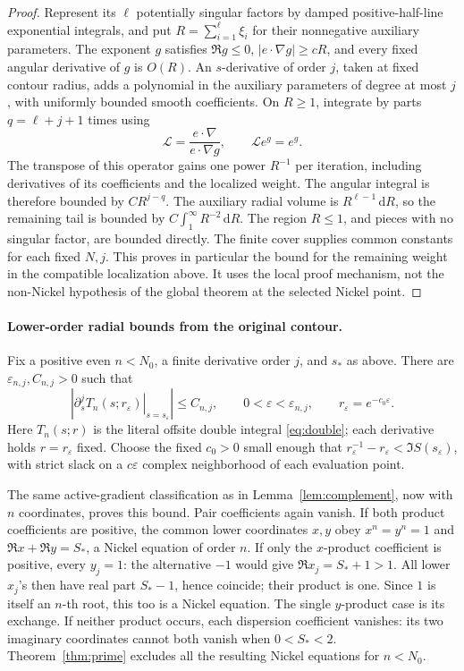 \documentclass[11pt]{article}
\numberwithin{equation}{section}
\theoremstyle{definition}
\newcommand{\dd}{\,\mathrm d}
\newcommand{\eps}{\varepsilon}
\begin{document}
\begin{proof}
Represent its \(\ell\) potentially singular factors by damped
positive-half-line exponential integrals, and put
\(R=\sum_{i=1}^{\ell}\xi_i\) for their nonnegative auxiliary
parameters. The exponent \(g\) satisfies \(\Re g\le0\),
\(|e\cdot\nabla g|\ge cR\), and every fixed angular derivative
of \(g\) is \(O(R)\). An \(s\)-derivative of order \(j\), taken
at fixed contour radius, adds a polynomial in the auxiliary parameters
of degree at most \(j\), with uniformly bounded smooth coefficients.
On \(R\ge1\), integrate by parts \(q=\ell+j+1\) times using
\[
 \mathcal L=\frac{e\cdot\nabla}{e\cdot\nabla g},
 \qquad \mathcal L e^g=e^g.
\]
The transpose of this operator gains one power \(R^{-1}\) per
iteration, including derivatives of its coefficients and the localized
weight. The angular integral is therefore bounded by \(CR^{j-q}\).
The auxiliary radial volume is \(R^{\ell-1}\dd R\), so the
remaining tail is bounded by \(C\int_1^\infty R^{-2}\dd R\).
The region \(R\le1\), and pieces with no singular factor, are bounded
directly. The finite cover supplies common constants for each fixed
\(N,j\). This proves in particular the bound for the remaining
weight in the compatible localization above. It uses the local proof
mechanism, not the non-Nickel hypothesis of the global theorem at
the selected Nickel point.
\end{proof}

\paragraph{Lower-order radial bounds from the original contour.}
Fix a positive even \(n<N_0\), a finite derivative order \(j\), and
\(s_*\) as above. There are \(\eps_{n,j},C_{n,j}>0\) such that
\[
 \left|\left.\partial_s^j T_n(s;r_\eps)\right|_{s=s_\eps}\right|
 \le C_{n,j},\qquad 0<\eps<\eps_{n,j},\qquad
 r_\eps=e^{-c_0\eps}.
\]
Here \(T_n(s;r)\) is the literal offsite double integral
\eqref{eq:double}; each derivative holds \(r=r_\eps\) fixed.
Choose the fixed \(c_0>0\) small enough that
\(r_\eps^{-1}-r_\eps<\Im S(s_\eps)\), with strict slack on a
\(c\eps\) complex neighborhood of each evaluation point.

The same active-gradient classification as in
Lemma~\ref{lem:complement}, now with \(n\) coordinates, proves this bound. Pair coefficients
again vanish. If both product coefficients are positive, the common
lower coordinates \(x,y\) obey \(x^n=y^n=1\) and
\(\Re x+\Re y=S_*\), a Nickel equation of order \(n\).
If only the \(x\)-product coefficient is positive, every \(y_j=1\):
the alternative \(-1\) would give \(\Re x_j=S_*+1>1\).
All lower \(x_j\)'s then have real part \(S_*-1\), hence coincide;
their product is one. Since \(1\) is itself an \(n\)-th root,
this too is a Nickel equation. The single \(y\)-product case is its
exchange. If neither product occurs, each dispersion coefficient
vanishes: its two imaginary coordinates cannot both vanish when
\(0<S_*<2\). Theorem~\ref{thm:prime} excludes all the resulting
Nickel equations for \(n<N_0\).
\end{document}
